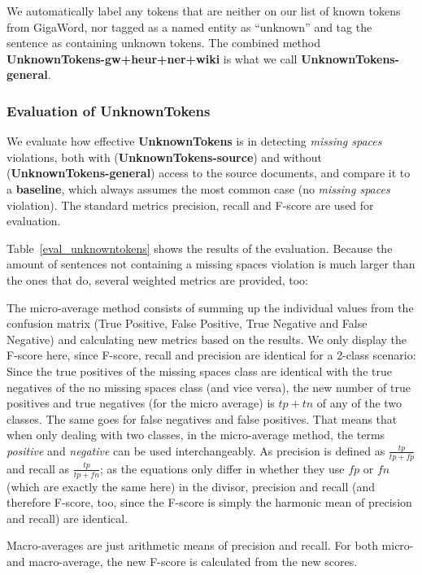 \documentclass[a4paper,10pt]{scrartcl}
\theoremstyle{style}
\begin{document}
We automatically label any tokens that are neither on our list of known tokens from GigaWord, nor tagged as a named entity as ``unknown'' and tag the sentence as containing unknown tokens. The combined method \textbf{UnknownTokens-gw+heur+ner+wiki} is what we call \textbf{UnknownTokens-general}.

\subsubsection{Evaluation of UnknownTokens}
We evaluate how effective \textbf{UnknownTokens} is in detecting \textit{missing spaces} violations, both with (\textbf{UnknownTokens-source}) and without (\textbf{UnknownTokens-general}) access to the source documents, and compare it to a \textbf{baseline}, which always assumes the most common case (no \textit{missing spaces} violation).
The standard metrics precision, recall and F-score are used for evaluation.

Table~\ref{eval_unknowntokens} shows the results of the evaluation. Because the amount of sentences not containing a missing spaces violation is much larger than the ones that do, several weighted metrics are provided, too:

The micro-average method consists of summing up the individual values from the confusion matrix (True Positive, False Positive, True Negative and False Negative) and calculating new metrics based on the results. We only display the F-score here, since F-score, recall and precision are identical for a 2-class scenario: Since the true positives of the missing spaces class are identical with the true negatives of the no missing spaces class (and vice versa), the new number of true positives and true negatives (for the micro average) is $tp + tn$ of any of the two classes. The same goes for false negatives and false positives. That means that when only dealing with two classes, in the micro-average method, the terms \textit{positive} and \textit{negative} can be used interchangeably. As precision is defined as $\frac{tp}{tp+fp}$ and recall as $\frac{tp}{tp+fn}$; as the equations only differ in whether they use $fp$ or $fn$ (which are exactly the same here) in the divisor, precision and recall (and therefore F-score, too, since the F-score is simply the harmonic mean of precision and recall) are identical.

Macro-averages are just arithmetic means of precision and recall. For both micro- and macro-average, the new F-score is calculated from the new scores.
\end{document}
